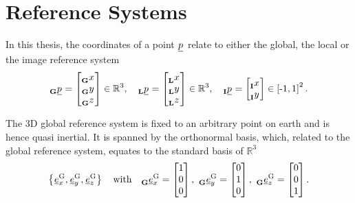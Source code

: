 \section{Reference Systems}
In this thesis, the coordinates of a point 
$\pos[]{}{}{}{}$
relate to either the global, the local or the image reference system
\begin{equation}
    \pos[]{}{}{\grs}{} = \begin{bmatrix}
        \x[]{}{}{\grs}{} \\ \y[]{}{}{\grs}{} \\ \z[]{}{}{\grs}{}
    \end{bmatrix} \in \mathbb{R}^3
    ,\quad 
    \pos[]{}{}{\lrs}{} = \begin{bmatrix}
        \x[]{}{}{\lrs}{} \\ \y[]{}{}{\lrs}{} \\ \z[]{}{}{\lrs}{}
    \end{bmatrix} \in \mathbb{R}^3
    ,\quad 
    \pos[]{}{}{\irs}{} = \begin{bmatrix}
        \x[]{}{}{\irs}{} \\ \y[]{}{}{\irs}{}
    \end{bmatrix} \in \left[\text -1, 1\right]^2.
\end{equation}


The 3D global reference system
is fixed to an arbitrary point on earth
and is hence quasi inertial.
It is spanned by the orthonormal basis,
which, related to the global reference system,
equates to the standard basis of $\mathbb{R}^3$
\begin{equation}
    \left\{
        \unitvec[]{\text G}{x}{}{},
        \unitvec[]{\text G}{y}{}{},
        \unitvec[]{\text G}{z}{}{}
    \right\}
    \quad \text{with} \quad 
    \unitvec[]{\text G}{x}{\grs}{} = \begin{bmatrix} 1 \\ 0 \\ 0 \end{bmatrix},\ 
    \unitvec[]{\text G}{y}{\grs}{} = \begin{bmatrix} 0 \\ 1 \\ 0 \end{bmatrix},\ 
    \unitvec[]{\text G}{z}{\grs}{} = \begin{bmatrix} 0 \\ 0 \\ 1 \end{bmatrix}.
\end{equation}


